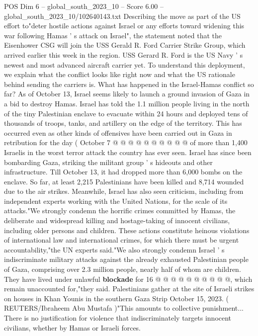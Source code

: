 \begin{textsample}{POS Dim 6 – global\_south\_2023\_10 – Score 6.00 – global\_south\_2023\_10/102640143.txt}  \label{ex:f6_pos_291}
Describing the move as part of the US effort to"deter hostile actions against Israel or any efforts toward widening this war following Hamas ' s attack on Israel", the statement noted that the Eisenhower CSG will join the USS Gerald R.
Ford Carrier Strike Group, which arrived earlier this week in the region.
USS Gerard R.
Ford is the US Navy ' s newest and most advanced aircraft carrier yet.
To understand this deployment, we explain what the conflict looks like right now and what the US rationale behind sending the carriers is.
What has happened in the Israel-Hamas conflict so far?
As of October 13, Israel seems likely to launch a ground invasion of Gaza in a bid to destroy Hamas.
Israel has told the 1.1 million people living in the north of the tiny Palestinian enclave to evacuate within 24 hours and deployed tens of thousands of troops, tanks, and artillery on the edge of the territory.
This has occurred even as other kinds of offensives have been carried out in Gaza in retribution for the day ( October 7 @ @ @ @ @ @ @ @ @ @ of more than 1,400 Israelis in the worst terror attack the country has ever seen.
Israel has since been bombarding Gaza, striking the militant group ' s hideouts and other infrastructure.
Till October 13, it had dropped more than 6,000 bombs on the enclave.
So far, at least 2,215 Palestinians have been killed and 8,714 wounded due to the air strikes.
Meanwhile, Israel has also seen criticism, including from independent experts working with the United Nations, for the scale of its attacks."We strongly condemn the horrific crimes committed by Hamas, the deliberate and widespread killing and hostage-taking of innocent civilians, including older persons and children.
These actions constitute heinous violations of international law and international crimes, for which there must be urgent accountability,"the UN experts said."We also strongly condemn Israel ' s indiscriminate military attacks against the already exhausted Palestinian people of Gaza, comprising over 2.3 million people, nearly half of whom are children.
They have lived under unlawful \textbf{blockade} for 16 @ @ @ @ @ @ @ @ @ @, which remain unaccounted for,"they said.
Palestinians gather at the site of Israeli strikes on houses in Khan Younis in the southern Gaza Strip October 15, 2023. ( REUTERS/Ibraheem Abu Mustafa )"This amounts to collective punishment...
There is no justification for violence that indiscriminately targets innocent civilians, whether by Hamas or Israeli forces.

\end{textsample}

